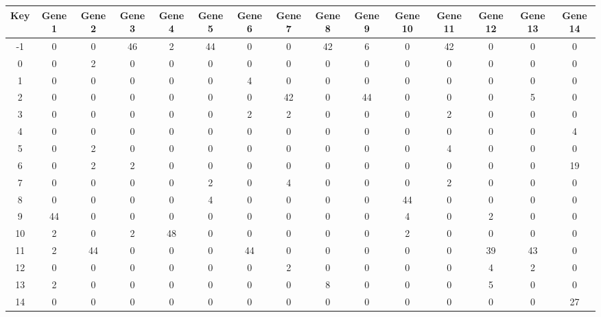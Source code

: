 \begin{tabular}{|c|c|c|c|c|c|c|c|c|c|c|c|c|c|c|}
\hline
Key & Gene 1 & Gene 2 & Gene 3 & Gene 4 & Gene 5 & Gene 6 & Gene 7 & Gene 8 & Gene 9 & Gene 10 & Gene 11 & Gene 12 & Gene 13 & Gene 14 \\
\hline
-1 & 0 & 0 & 46 & 2 & 44 & 0 & 0 & 42 & 6 & 0 & 42 & 0 & 0 & 0 \\
0 & 0 & 2 & 0 & 0 & 0 & 0 & 0 & 0 & 0 & 0 & 0 & 0 & 0 & 0 \\
1 & 0 & 0 & 0 & 0 & 0 & 4 & 0 & 0 & 0 & 0 & 0 & 0 & 0 & 0 \\
2 & 0 & 0 & 0 & 0 & 0 & 0 & 42 & 0 & 44 & 0 & 0 & 0 & 5 & 0 \\
3 & 0 & 0 & 0 & 0 & 0 & 2 & 2 & 0 & 0 & 0 & 2 & 0 & 0 & 0 \\
4 & 0 & 0 & 0 & 0 & 0 & 0 & 0 & 0 & 0 & 0 & 0 & 0 & 0 & 4 \\
5 & 0 & 2 & 0 & 0 & 0 & 0 & 0 & 0 & 0 & 0 & 4 & 0 & 0 & 0 \\
6 & 0 & 2 & 2 & 0 & 0 & 0 & 0 & 0 & 0 & 0 & 0 & 0 & 0 & 19 \\
7 & 0 & 0 & 0 & 0 & 2 & 0 & 4 & 0 & 0 & 0 & 2 & 0 & 0 & 0 \\
8 & 0 & 0 & 0 & 0 & 4 & 0 & 0 & 0 & 0 & 44 & 0 & 0 & 0 & 0 \\
9 & 44 & 0 & 0 & 0 & 0 & 0 & 0 & 0 & 0 & 4 & 0 & 2 & 0 & 0 \\
10 & 2 & 0 & 2 & 48 & 0 & 0 & 0 & 0 & 0 & 2 & 0 & 0 & 0 & 0 \\
11 & 2 & 44 & 0 & 0 & 0 & 44 & 0 & 0 & 0 & 0 & 0 & 39 & 43 & 0 \\
12 & 0 & 0 & 0 & 0 & 0 & 0 & 2 & 0 & 0 & 0 & 0 & 4 & 2 & 0 \\
13 & 2 & 0 & 0 & 0 & 0 & 0 & 0 & 8 & 0 & 0 & 0 & 5 & 0 & 0 \\
14 & 0 & 0 & 0 & 0 & 0 & 0 & 0 & 0 & 0 & 0 & 0 & 0 & 0 & 27 \\
\hline
\end{tabular}